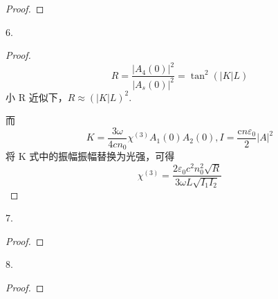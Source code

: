\begin{proof}

\end{proof}

\begin{exercise}
    6. 
\end{exercise}

\begin{proof}
    $$
    R=\frac{\left|A_{4}(0)\right|^{2}}{\left|A_{s}(0)\right|^{2}}=\tan ^{2}(|K| L)
    $$
    小 R 近似下，$
    R\approx(|K| L)^2
    $.

    而$$
K=\frac{3 \omega}{4 c n_{0}} \chi^{(3)} A_{1}(0) A_{2}(0)
, 
I=\frac{\mathrm{c} n \varepsilon_{0}}{2}|A|^{2}
$$
将 K 式中的振幅振幅替换为光强，可得
$$
\chi^{(3)}=\frac{2 \varepsilon_{0} c^{2} n_{0}^{2} \sqrt{R}}{3 \omega L \sqrt{I_{1} I_{2}}}
$$
\end{proof}
    
\begin{exercise}
    7. 
\end{exercise}

\begin{proof}

\end{proof}

\begin{exercise}
8. 
\end{exercise}

\begin{proof}

\end{proof}